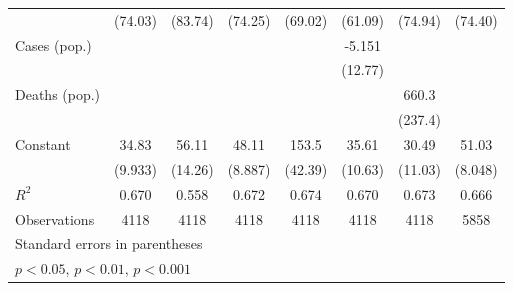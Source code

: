 \documentclass{article}
\begin{document}
{\begin{longtable}{l*{7}{c}}
                &  (74.03)         &  (83.74)         &  (74.25)         &  (69.02)         &  (61.09)         &  (74.94)         &  (74.40)         \\
Cases (pop.)    &                  &                  &                  &                  &   -5.151         &                  &                  \\
                &                  &                  &                  &                  &  (12.77)         &                  &                  \\
Deaths (pop.)   &                  &                  &                  &                  &                  &    660.3\sym{**} &                  \\
                &                  &                  &                  &                  &                  &  (237.4)         &                  \\
Constant        &    34.83\sym{**} &    56.11\sym{***}&    48.11\sym{***}&    153.5\sym{**} &    35.61\sym{**} &    30.49\sym{**} &    51.03\sym{***}\\
                &  (9.933)         &  (14.26)         &  (8.887)         &  (42.39)         &  (10.63)         &  (11.03)         &  (8.048)         \\
\hline
\(R^{2}\)       &    0.670         &    0.558         &    0.672         &    0.674         &    0.670         &    0.673         &    0.666         \\
Observations    &     4118         &     4118         &     4118         &     4118         &     4118         &     4118         &     5858         \\
\hline\hline
\multicolumn{8}{l}{\footnotesize Standard errors in parentheses}\\
\multicolumn{8}{l}{\footnotesize \sym{*} \(p<0.05\), \sym{**} \(p<0.01\), \sym{***} \(p<0.001\)}\\
\end{longtable}
}
\end{document}
